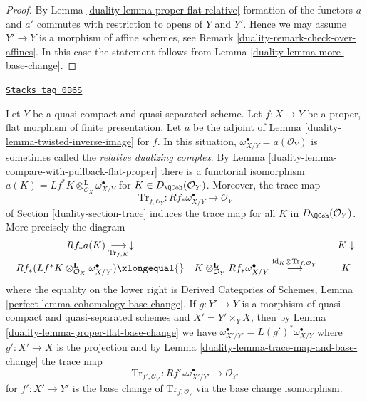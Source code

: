 \begin{proof}

By Lemma \ref{duality-lemma-proper-flat-relative} formation of the
functors $a$ and $a'$ commutes with restriction to opens of $Y$ and $Y'$.
Hence we may assume $Y' \to Y$ is a morphism of affine schemes, see
Remark \ref{duality-remark-check-over-affines}. In this
case the statement follows from Lemma \ref{duality-lemma-more-base-change}.
\end{proof}

\begin{remark}
\label{duality-remark-relative-dualizing-complex}
\href{https://stacks.math.columbia.edu/tag/0B6S}{\texttt{Stacks tag 0B6S}}

Let $Y$ be a quasi-compact and quasi-separated scheme.
Let $f : X \to Y$ be a proper, flat morphism of finite presentation.
Let $a$ be the adjoint of Lemma \ref{duality-lemma-twisted-inverse-image} for $f$.
In this situation, $\omega_{X/Y}^\bullet = a(\mathcal{O}_Y)$
is sometimes called the {\it relative dualizing complex}. By
Lemma \ref{duality-lemma-compare-with-pullback-flat-proper}
there is a functorial isomorphism
$a(K) = Lf^*K \otimes_{\mathcal{O}_X}^\mathbf{L} \omega_{X/Y}^\bullet$
for $K \in D_\QCoh(\mathcal{O}_Y)$. Moreover, the trace map
$$
\text{Tr}_{f, \mathcal{O}_Y} : Rf_*\omega_{X/Y}^\bullet \to \mathcal{O}_Y
$$
of Section \ref{duality-section-trace} induces the trace map for all $K$
in $D_\QCoh(\mathcal{O}_Y)$. More precisely the diagram
$$
\begin{array}{cccc}Rf_*a(K) \underset{\text{Tr}_{f, K}}{\longrightarrow}\downarrow &  &  & K \downarrow \\ Rf_*(Lf^*K \otimes_{\mathcal{O}_X}^\mathbf{L} \omega_{X/Y}^\bullet)
\xlongequal{} & K \otimes_{\mathcal{O}_Y}^\mathbf{L} Rf_*\omega_{X/Y}^\bullet
\overset{\text{id}_K \otimes \text{Tr}_{f, \mathcal{O}_Y}}{\longrightarrow} &  & K\end{array}
$$
where the equality on the lower right is
Derived Categories of Schemes, Lemma \ref{perfect-lemma-cohomology-base-change}.
If $g : Y' \to Y$ is a
morphism of quasi-compact and quasi-separated schemes
and $X' = Y' \times_Y X$, then by
Lemma \ref{duality-lemma-proper-flat-base-change} we have
$\omega_{X'/Y'}^\bullet = L(g')^*\omega_{X/Y}^\bullet$ where $g' : X' \to X$
is the projection and by Lemma \ref{duality-lemma-trace-map-and-base-change}
the trace map
$$
\text{Tr}_{f', \mathcal{O}_{Y'}} :
Rf'_*\omega_{X'/Y'}^\bullet \to \mathcal{O}_{Y'}
$$
for $f' : X' \to Y'$ is the base change of $\text{Tr}_{f, \mathcal{O}_Y}$
via the base change isomorphism.
\end{remark}

